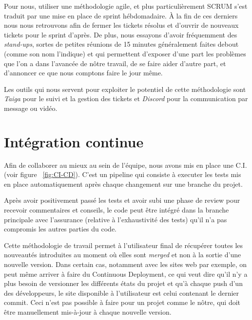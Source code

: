 Pour nous, utiliser une méthodologie agile, et plus particulièrement SCRUM s'est
traduit par une mise en place de sprint hébdomadaire. À la fin de ces derniers nous nous
retrouvons afin de fermer les tickets résolus et d'ouvrir de nouveaux tickets pour le
sprint d'après. De plus, nous essayons d'avoir fréquemment des \emph{stand-ups}, sortes de
petites réunions de 15 minutes généralement faites debout (comme son nom l'indique) et qui permettent d'exposer
d'une part les problèmes que l'on a dans l'avancée de nôtre travail, de se faire
aider d'autre part, et d'annoncer ce que nous comptons faire le jour même.

Les outils qui nous servent pour exploiter le potentiel de cette méthodologie sont
\emph{Taiga} pour le suivi et la gestion des tickets et \emph{Discord} pour la
communication par message ou vidéo.

\section{Intégration continue}
Afin de collaborer au mieux au sein de l'équipe, nous avons mis en place
une C.I. (voir figure ~\ref{fig:CI-CD}). C'est un pipeline qui consiste à executer
les tests mis en place automatiquement après chaque changement sur une branche
du projet.
\vspace{0.5cm}

Après avoir positivement passé les tests et avoir subi une phase de review
pour recevoir commentaires et conseils, le code peut être intégré dans la
branche principale avec l'assurance (relative à l’exhaustivité des tests) qu'il
n'a pas compromis les autres parties du code.
\vspace{0.5cm}

Cette méthodologie de travail permet à l’utilisateur final de récupérer toutes
les nouveautés introduites au moment où elles sont \emph{merged} et non à la
sortie d’une nouvelle version. Dans certain cas, notamment avec les sites web
par exemple, on peut même arriver à faire du Continuous Deployment, ce qui veut
dire qu’il n’y a plus besoin de versionner les différents états du projet et
qu’à chaque push d’un des développeurs, le site disponible à l’utilisateur est
celui contenant le dernier commit. Ceci n'est pas possible à faire pour un
projet comme le nôtre, qui doit être manuellement mis-à-jour à chaque nouvelle
version.
